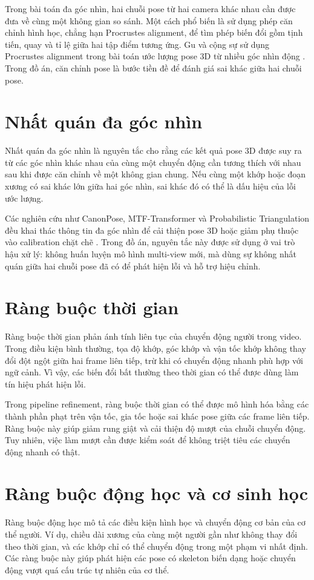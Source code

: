 \documentclass[../DoAn.tex]{subfiles}
\begin{document}
Trong bài toán đa góc nhìn, hai chuỗi pose từ hai camera khác nhau cần được đưa về cùng một không gian so sánh. Một cách phổ biến là sử dụng phép căn chỉnh hình học, chẳng hạn Procrustes alignment, để tìm phép biến đổi gồm tịnh tiến, quay và tỉ lệ giữa hai tập điểm tương ứng. Gu và cộng sự sử dụng Procrustes alignment trong bài toán ước lượng pose 3D từ nhiều góc nhìn động \cite{gu2024multiview}. Trong đồ án, căn chỉnh pose là bước tiền đề để đánh giá sai khác giữa hai chuỗi pose.

\section{Nhất quán đa góc nhìn}
\label{sec:theory_multiview}
Nhất quán đa góc nhìn là nguyên tắc cho rằng các kết quả pose 3D được suy ra từ các góc nhìn khác nhau của cùng một chuyển động cần tương thích với nhau sau khi được căn chỉnh về một không gian chung. Nếu cùng một khớp hoặc đoạn xương có sai khác lớn giữa hai góc nhìn, sai khác đó có thể là dấu hiệu của lỗi ước lượng.

Các nghiên cứu như CanonPose, MTF-Transformer và Probabilistic Triangulation đều khai thác thông tin đa góc nhìn để cải thiện pose 3D hoặc giảm phụ thuộc vào calibration chặt chẽ \cite{canonpose2021,mtftransformer2023,probtriangulation2023}. Trong đồ án, nguyên tắc này được sử dụng ở vai trò hậu xử lý: không huấn luyện mô hình multi-view mới, mà dùng sự không nhất quán giữa hai chuỗi pose đã có để phát hiện lỗi và hỗ trợ hiệu chỉnh.

\section{Ràng buộc thời gian}
\label{sec:theory_temporal}
Ràng buộc thời gian phản ánh tính liên tục của chuyển động người trong video. Trong điều kiện bình thường, tọa độ khớp, góc khớp và vận tốc khớp không thay đổi đột ngột giữa hai frame liên tiếp, trừ khi có chuyển động nhanh phù hợp với ngữ cảnh. Vì vậy, các biến đổi bất thường theo thời gian có thể được dùng làm tín hiệu phát hiện lỗi.

Trong pipeline refinement, ràng buộc thời gian có thể được mô hình hóa bằng các thành phần phạt trên vận tốc, gia tốc hoặc sai khác pose giữa các frame liên tiếp. Ràng buộc này giúp giảm rung giật và cải thiện độ mượt của chuỗi chuyển động. Tuy nhiên, việc làm mượt cần được kiểm soát để không triệt tiêu các chuyển động nhanh có thật.

\section{Ràng buộc động học và cơ sinh học}
\label{sec:theory_kinematics}
Ràng buộc động học mô tả các điều kiện hình học và chuyển động cơ bản của cơ thể người. Ví dụ, chiều dài xương của cùng một người gần như không thay đổi theo thời gian, và các khớp chỉ có thể chuyển động trong một phạm vi nhất định. Các ràng buộc này giúp phát hiện các pose có skeleton biến dạng hoặc chuyển động vượt quá cấu trúc tự nhiên của cơ thể.
\end{document}
